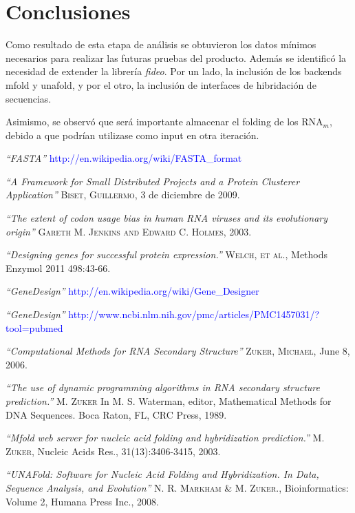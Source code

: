 \documentclass[12pt,a4paper,spanish]{article}
\begin{document}
\section{Conclusiones}
	Como resultado de esta etapa de análisis se obtuvieron los datos mínimos necesarios para realizar las futuras pruebas 		del producto. Además se identificó la necesidad de extender la librería \emph{fideo}. Por un lado, la inclusión de los 		backends \textsf{mfold}\cite{7}\cite{8} y \textsf{unafold}\cite{9}, y por el otro, la inclusión de interfaces de 		hibridación de secuencias.
	\par Asimismo, se observó que será importante almacenar el folding de los RNA$_m$, debido a que podrían utilizase como 		input en otra iteración.



\begin{thebibliography}{99}
\small	{} {\em{“FASTA”}} \textcolor{blue}{http://en.wikipedia.org/wiki/FASTA\_format}

\small	{} {\em{“A Framework for Small Distributed Projects and a Protein Clusterer Application”}}
			\textsc{Biset, Guillermo}, 3 de diciembre de 2009.

\small {} {\em{“The extent of codon usage bias in human RNA viruses and its evolutionary origin”}}
			\textsc{Gareth M. Jenkins and Edward C. Holmes}, 2003.
 
\small {} {\em{“Designing genes for successful protein expression.”}}
			\textsc{Welch, et al.}, Methods Enzymol 2011 498:43-66. 

\small {} {\em{“GeneDesign”}} \textcolor{blue}{http://en.wikipedia.org/wiki/Gene\_Designer}

\small {} {\em{“GeneDesign”}} \textcolor{blue}{http://www.ncbi.nlm.nih.gov/pmc/articles/PMC1457031/?tool=pubmed}

\small {} {\em{“Computational Methods for RNA Secondary Structure”}} 
			\textsc{Zuker, Michael}, June 8, 2006.

\small {} {\em{“The use of dynamic programming algorithms in RNA secondary structure prediction.”}}
		\textsc{M. Zuker} In M. S. Waterman, editor, Mathematical Methods for DNA Sequences. Boca Raton, FL, CRC Press, 		1989.

\small {} {\em{“Mfold web server for nucleic acid folding and hybridization prediction.”}}
		\textsc{M. Zuker}, Nucleic Acids Res., 31(13):3406-3415, 2003.

\small {} {\em{“UNAFold: Software for Nucleic Acid Folding and Hybridization. In Data, Sequence Analysis, and 			Evolution”}}
		\textsc{N. R. Markham \& M. Zuker.}, Bioinformatics: Volume 2, Humana Press Inc., 2008.

\end{thebibliography}
\end{document}
